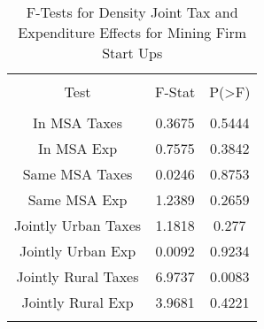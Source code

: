 
\begin{table}[!htbp] \centering 
  \caption{F-Tests for Density Joint Tax and Expenditure Effects for Mining Firm Start Ups} 
  \label{21Ftests} 
\begin{tabular}{@{\extracolsep{5pt}} ccc} 
\\[-1.8ex]\hline 
\hline \\[-1.8ex] 
Test & F-Stat & P(\textgreater F) \\ 
\hline \\[-1.8ex] 
In MSA Taxes & 0.3675 & 0.5444 \\ 
In MSA Exp & 0.7575 & 0.3842 \\ 
Same MSA Taxes & 0.0246 & 0.8753 \\ 
Same MSA Exp & 1.2389 & 0.2659 \\ 
Jointly Urban Taxes & 1.1818 & 0.277 \\ 
Jointly Urban Exp & 0.0092 & 0.9234 \\ 
Jointly Rural Taxes & 6.9737 & 0.0083 \\ 
Jointly Rural Exp & 3.9681 & 0.4221 \\ 
\hline \\[-1.8ex] 
\end{tabular} 
\end{table} 
